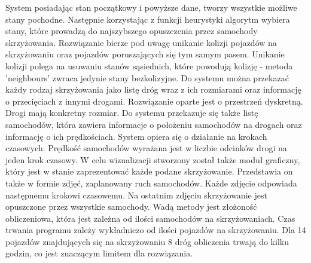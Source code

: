 System posiadając stan początkowy i powyższe dane, tworzy wszystkie możliwe stany pochodne. Następnie korzystając z funkcji heurystyki algorytm wybiera stany, które prowadzą do najszybszego opuszczenia przez samochody skrzyżowania.
\newline
\indent
Rozwiązanie bierze pod uwagę unikanie kolizji pojazdów na skrzyżowaniu oraz pojazdów poruszających się tym samym pasem. Unikanie kolizji polega na usuwaniu stanów sąsiednich, które powodują kolizję - metoda 'neighbours' zwraca jedynie stany bezkolizyjne.
\newline
\indent
Do systemu można przekazać każdy rodzaj skrzyżowania jako listę dróg wraz z ich rozmiarami oraz informację o przecięciach z innymi drogami. Rozwiązanie oparte jest o przestrzeń dyskretną. Drogi mają konkretny rozmiar. Do systemu przekazuje się także listę samochodów, która zawiera informacje o położeniu samochodów na drogach oraz informację o ich prędkościach. System opiera się o działanie na krokach czasowych. Prędkość samochodów wyrażana jest w liczbie odcinków drogi na jeden krok czasowy.
\newline
\indent
W celu wizualizacji stworzony został także moduł graficzny, który jest w stanie zaprezentować każde podane skrzyżowanie. Przedstawia on także w formie zdjęć, zaplanowany ruch samochodów. Każde zdjęcie odpowiada następnemu krokowi czasowemu. Na ostatnim zdjęciu skrzyżowanie jest opuszczone przez wszystkie samochody.
\newline
\indent
Wadą metody jest złożoność obliczeniowa, która jest zależna od ilości samochodów na skrzyżowaniach. Czas trwania programu zależy wykładniczo od ilości pojazdów na skrzyżowaniu. Dla 14 pojazdów znajdujących się na skrzyżowaniu 8 dróg obliczenia trwają do kilku godzin, co jest znaczącym limitem dla rozwiązania.

